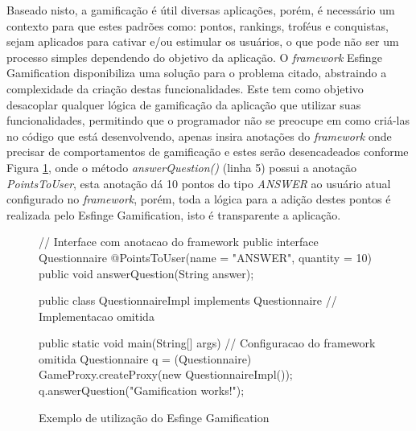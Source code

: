 \par Baseado nisto, a gamificação é útil diversas aplicações, porém, é necessário um contexto para que estes padrões como: pontos, rankings, troféus e conquistas, sejam aplicados para cativar e/ou estimular os usuários, o que pode não ser um processo simples dependendo do objetivo da aplicação. O \textit{framework} Esfinge Gamification disponibiliza uma solução para o problema citado, abstraindo a complexidade da criação destas funcionalidades. Este tem como objetivo desacoplar qualquer lógica de gamificação da aplicação que utilizar suas funcionalidades, permitindo que o programador não se preocupe em como criá-las no código que está desenvolvendo, apenas insira anotações do \textit{framework} onde precisar de comportamentos de gamificação  e estes serão desencadeados conforme Figura \ref{fig:esfingesample}, onde o método \textit{answerQuestion()} (linha 5) possui a anotação \textit{PointsToUser}, esta anotação dá 10 pontos do tipo \textit{ANSWER} ao usuário atual configurado no \textit{framework}, porém, toda a lógica para a adição destes pontos é realizada pelo Esfinge Gamification, isto é transparente a aplicação.

\begin{figure}[H]
    \centering
    \begin{java}

// Interface com anotacao do framework
public interface Questionnaire {
    @PointsToUser(name = "ANSWER", quantity = 10)
    public void answerQuestion(String answer);
}

public class QuestionnaireImpl implements Questionnaire {
    // Implementacao omitida
}

public static void main(String[] args) {
    // Configuracao do framework omitida
    Questionnaire q = (Questionnaire) GameProxy.createProxy(new QuestionnaireImpl());
    q.answerQuestion("Gamification works!");
}
\end{java}
    \caption{Exemplo de utilização do Esfinge Gamification}
    \label{fig:esfingesample}
\end{figure}

